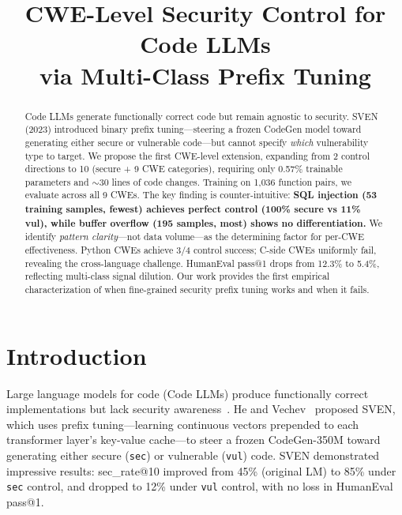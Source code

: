 \documentclass[conference]{IEEEtran}
\begin{document}
\title{CWE-Level Security Control for Code LLMs\\via Multi-Class Prefix Tuning}

\author{
}

\maketitle

\begin{abstract}
Code LLMs generate functionally correct code but remain agnostic to security. SVEN (2023) introduced binary prefix tuning—steering a frozen CodeGen model toward generating either secure or vulnerable code—but cannot specify \textit{which} vulnerability type to target. We propose the first CWE-level extension, expanding from 2 control directions to 10 (secure + 9 CWE categories), requiring only 0.57\% trainable parameters and $\sim$30 lines of code changes. Training on 1,036 function pairs, we evaluate across all 9 CWEs. The key finding is counter-intuitive: \textbf{SQL injection (53 training samples, fewest) achieves perfect control (100\% secure vs 11\% vul), while buffer overflow (195 samples, most) shows no differentiation.} We identify \textit{pattern clarity}—not data volume—as the determining factor for per-CWE effectiveness. Python CWEs achieve 3/4 control success; C-side CWEs uniformly fail, revealing the cross-language challenge. HumanEval pass@1 drops from 12.3\% to 5.4\%, reflecting multi-class signal dilution. Our work provides the first empirical characterization of when fine-grained security prefix tuning works and when it fails.
\end{abstract}

\section{Introduction}

Large language models for code (Code LLMs) produce functionally correct implementations but lack security awareness~\cite{chen2021codex, nijkamp2022codegen}. He and Vechev~\cite{he2023sven} proposed SVEN, which uses prefix tuning—learning continuous vectors prepended to each transformer layer's key-value cache—to steer a frozen CodeGen-350M toward generating either secure (\texttt{sec}) or vulnerable (\texttt{vul}) code. SVEN demonstrated impressive results: sec\_rate@10 improved from 45\% (original LM) to 85\% under \texttt{sec} control, and dropped to 12\% under \texttt{vul} control, with no loss in HumanEval pass@1.
\end{document}
